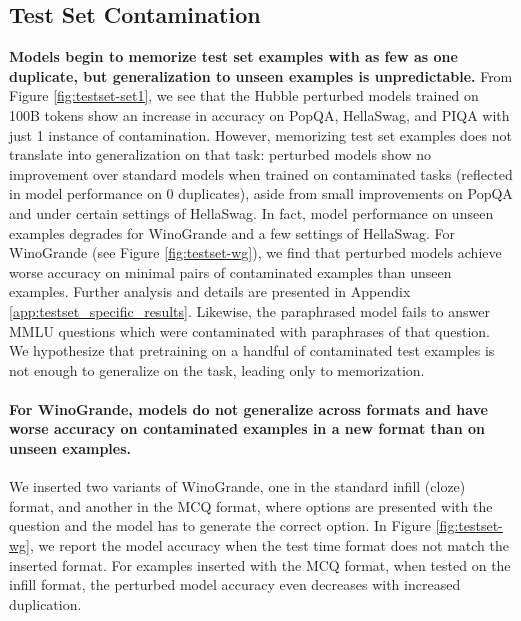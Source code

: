 \subsection{Test Set Contamination}

\textbf{Models begin to memorize test set examples with as few as one duplicate, but generalization to unseen examples is unpredictable.} From Figure \ref{fig:testset-set1}, we see that the Hubble perturbed models trained on 100B tokens show an increase in accuracy on PopQA, HellaSwag, and PIQA with just 1 instance of contamination.
However, memorizing test set examples does not translate into generalization on that task: perturbed models show no improvement over standard models when trained on contaminated tasks (reflected in model performance on 0 duplicates), aside from small improvements on PopQA and under certain settings of HellaSwag. In fact, model performance on unseen examples degrades for WinoGrande and a few settings of HellaSwag.
For WinoGrande (see Figure \ref{fig:testset-wg}), we find that perturbed models achieve worse accuracy on minimal pairs of contaminated examples than unseen examples. Further analysis and details are presented in Appendix \ref{app:testset_specific_results}.
Likewise, the paraphrased model fails to answer MMLU questions which were contaminated with paraphrases of that question. We hypothesize that pretraining on a handful of contaminated test examples is not enough to generalize on the task, leading only to memorization.

\paragraph{For WinoGrande, models do not generalize across formats and have worse accuracy on contaminated examples in a new format than on unseen examples.} We inserted two variants of WinoGrande, one in the standard infill (cloze) format, and another in the MCQ format, where options are presented with the question and the model has to generate the correct option. In Figure \ref{fig:testset-wg}, we report the model accuracy when the test time format does not match the inserted format. For examples inserted with the MCQ format, when tested on the infill format, the perturbed model accuracy even decreases with increased duplication.

